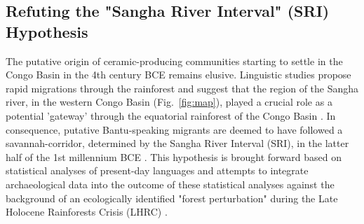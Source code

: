 \documentclass[smallextended,natbib]{svjour3}       %
\begin{document}
\subsection*{Refuting the "Sangha River Interval" (SRI) Hypothesis}

The putative origin of ceramic-producing communities starting to settle in the Congo Basin in the 4th century BCE remains elusive. Linguistic studies propose rapid migrations through the rainforest \citep{Currie.2013,Whiteley.2019,Koile.2022} and suggest that the region of the Sangha river, in the western Congo Basin (Fig.~\ref{fig:map}), played a crucial role as a potential 'gateway' through the equatorial rainforest of the Congo Basin \citep{Grollemund.2015,Bostoen.2015,Grollemund.2023}. In consequence, putative Bantu-speaking migrants are deemed to have followed a savannah-corridor, determined by the Sangha River Interval (SRI), in the latter half of the 1st millennium BCE \citep{Grollemund.2015,Bostoen.2015}. This hypothesis is brought forward based on statistical analyses of present-day languages and attempts to integrate archaeological data into the outcome of these statistical analyses against the background of an ecologically identified "forest perturbation" \citep[356]{Bostoen.2015} during the Late Holocene Rainforests Crisis (LHRC) \citep{Vincens.1994,Elenga.1996,Raynaud-Farrera.1996,Maley.1998b,Vincens.1998,Maley.2004,Ngomanda.2009,Sangen.2009,Giresse.2020}. 
\end{document}
